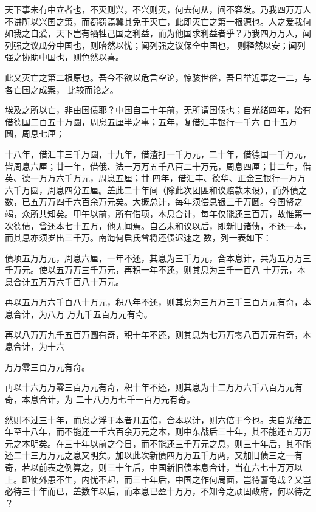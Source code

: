 \documentclass{article}
\begin{document}
\newpage

天下事未有中立者也，不灭则兴，不兴则灭，何去何从，间不容发。乃我四万万人不讲所以兴国之策，而窃窃焉冀其免于灭亡，此即灭亡之第一根源也。人之爱我何如我之自爱，天下岂有牺牲己国之利益，而为他国求利益者乎？乃我四万万人，闻列强之议瓜分中国也，则眙然以忧；闻列强之议保全中国也，
则释然以安；闻列强之协助中国也，则色然以喜。 

此又灭亡之第二根原也。吾今不欲以危言空论，惊骇世俗，吾且举近事之一二，与各亡国之成案，
比较而论之。 

埃及之所以亡，非由国债耶？中国自二十年前，无所谓国债也；自光绪四年，始有借德国二百五十万圆，周息五厘半之事；五年，复借汇丰银行一千六
百十五万圆，周息七厘； 

十八年，借汇丰三千万圆，十九年，借渣打一千万元，二十年，借德国一千万元，皆周息六厘；廿一年，借俄、法一万万五千八百二十万元，周息四厘；廿二年，借英、德一万万六千万元，周息五厘；廿
\newpage
四年，借汇丰、德华、正金三银行一万万六千万圆，周息四分五厘。盖此二十年间（除此次团匪和议赔款未设），而外债之数，已五万万四千六百余万元矣。大概总计，每年须偿息银三千万圆。今国帑之竭，众所共知矣。甲午以前，所有借项，本息合计，每年仅能还三百万，故惟第一次德债，曾还本七十五万，他无闻焉。自乙未和议以后，即新旧诸债，不还一本，而其息亦须岁出三千万。南海何启氏曾将还债迟速之
数，列一表如下： 

债项五万万元，周息六厘，一年不还，其息为三千万元，合本息计，共为五万万三千万元。使以五万万三千万元，再积一年不还，则其息为三千一百八
十万元，本息合计五万万六千百八十万元。 

再以五万万六千百八十万元，积八年不还，则其息为三万万三千三百万元有奇，本息合计，为八万
万九千五百万元有奇。 

再以八万万九千五百万圆有奇，积十年不还，则其息为七万万零八百万元有奇，本息合计，为十六
\newpage

万万零三百万元有奇。 

再以十六万万零三百万元有奇，积十年不还，则其息为十二万万六千八百万元有奇，本息合计，为
二十八万万七千一百万元有奇。 

然则不过三十年，而息之浮于本者几五倍，合本以计，则六倍于今也。夫自光绪五年至十八年，而不能还一千六百余万元之本，则中东战后三十年，其不能还五万万元之本明矣。在三十年以前之今日，而不能还三千万元之息，则三十年后，其不能还二十三万万元之息又明矣。加以此次新债四万万五千万两，又加旧债三之一有奇，若以前表之例算之，则三十年后，中国新旧债本息合计，当在六七十万万以上。即使外患不生，内忧不起，而三十年后，中国之作何局面，岂待蓍龟哉？又岂必待三十年而已，盖数年以后，而本息已盈十万万，不知今之顽固政府，何以待之
？ 
\end{document}
